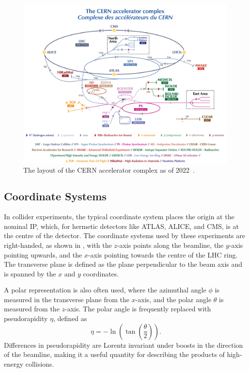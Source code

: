 \begin{figure}
    \centering
    \includegraphics[width=0.99\textwidth]{Figures/cern_atlas/complex.png}
    \caption{The layout of the CERN accelerator complex as of 2022~\cite{CERNAC}.}
    \label{fig:cern_accelerator_complex}
\end{figure}

\subsection{Coordinate Systems}

In collider experiments, the typical coordinate system places the origin at the nominal IP, which, for hermetic detectors like ATLAS, ALICE, and CMS, is at the centre of the detector.
The coordinate systems used by these experiments are right-handed, as shown in , with the $z$-axis points along the beamline, the $y$-axis pointing upwards, and the $x$-axis pointing towards the centre of the LHC ring.
The transverse plane is defined as the plane perpendicular to the beam axis and is spanned by the $x$ and $y$ coordinates.

A polar representation is also often used, where the azimuthal angle $\phi$ is measured in the transverse plane from the $x$-axis, and the polar angle $\theta$ is measured from the $z$-axis.
The polar angle is frequently replaced with pseudorapidity $\eta$, defined as
\begin{equation}
    \eta = -\ln \left( \tan \left( \frac{\theta}{2} \right) \right).
\end{equation}
Differences in pseudorapidity are Lorentz invariant under boosts in the direction of the beamline, making it a useful quantity for describing the products of high-energy collisions.

